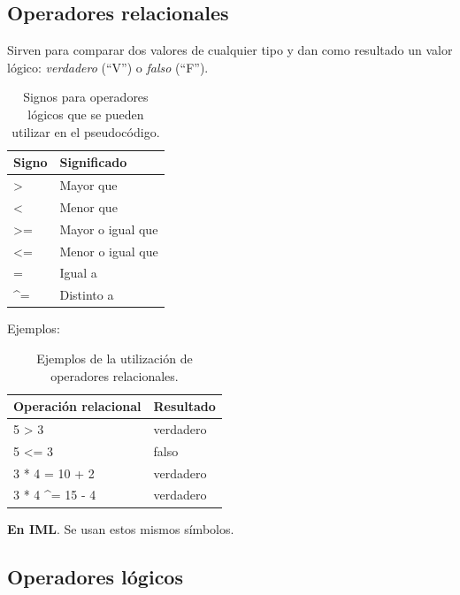 \documentclass[
]{book}
\begin{document}
\hypertarget{operadores-relacionales}{%
\subsection{Operadores relacionales}\label{operadores-relacionales}}

Sirven para comparar dos valores de cualquier tipo y dan como resultado un valor lógico: \emph{verdadero} (``V'') o \emph{falso} (``F'').

\begin{table}

\caption{\label{tab:unnamed-chunk-14}Signos para operadores lógicos que se pueden utilizar en el pseudocódigo.}
\centering
\begin{tabular}[t]{l|l}
\hline
Signo & Significado\\
\hline
> & Mayor que\\
\hline
< & Menor que\\
\hline
>= & Mayor o igual que\\
\hline
<= & Menor o igual que\\
\hline
= & Igual a\\
\hline
\textasciicircum{}= & Distinto a\\
\hline
\end{tabular}
\end{table}

Ejemplos:

\begin{table}

\caption{\label{tab:unnamed-chunk-15}Ejemplos de la utilización de operadores relacionales.}
\centering
\begin{tabular}[t]{l|l}
\hline
Operación relacional & Resultado\\
\hline
5 > 3 & verdadero\\
\hline
5 <= 3 & falso\\
\hline
3 * 4 = 10 + 2 & verdadero\\
\hline
3 * 4 \textasciicircum{}= 15 - 4 & verdadero\\
\hline
\end{tabular}
\end{table}

\textbf{En IML}. Se usan estos mismos símbolos.

\hypertarget{operadores-luxf3gicos}{%
\subsection{Operadores lógicos}\label{operadores-luxf3gicos}}
\end{document}
